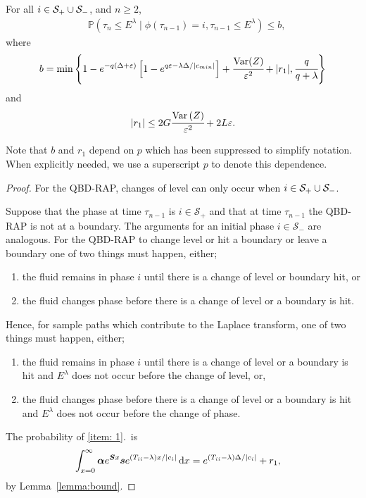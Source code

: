 \begin{lem}\label{lem: another bound}
	For all \(i\in\mathcal S_+\cup \mathcal{S}_-\), and \(n\geq 2\),
	\begin{align}
		&\mathbb P(\tau_n\leq E^\lambda \mid \phi(\tau_{n-1})=i, \tau_{n-1}\leq  E^\lambda ) \leq b,
	\end{align}
	where 
	\[b = \min\left\{1-e^{-q(\Delta+\varepsilon)}\left[1-e^{q\varepsilon-\lambda \Delta/|c_{min}|}\right] + \cfrac{\mathrm{Var}(Z)}{\varepsilon^2} + |r_1|,\cfrac{q}{q+\lambda}\right\}\]
	and  
	\[|r_1|\leq 2G\cfrac{\mathrm{Var} \left(Z\right)}{\varepsilon^2} + 2L\varepsilon.\]
\end{lem}
Note that \(b\) and \(r_1\) depend on \(p\) which has been suppressed to simplify notation. When explicitly needed, we use a superscript \(p\) to denote this dependence.  
\begin{proof}
	For the QBD-RAP, changes of level can only occur when \(i\in\mathcal S_+\cup\mathcal{S}_-\). 
	
	Suppose that the phase at time \(\tau_{n-1}\) is \(i\in\mathcal S_+\) and that at time \(\tau_{n-1}\) the QBD-RAP is not at a boundary. The arguments for an initial phase \(i\in\mathcal S_-\) are analogous. For the QBD-RAP to change level or hit a boundary or leave a boundary one of two things must happen, either; 
	\begin{enumerate}
		\item the fluid remains in phase \(i\) until there is a change of level or boundary hit, or
		\item the fluid changes phase before there is a change of level or a boundary is hit. 
	\end{enumerate}
	
	Hence, for sample paths which contribute to the Laplace transform, one of two things must happen, either; 
	\begin{enumerate}
		\item the fluid remains in phase \(i\) until there is a change of level or a boundary is hit and \(E^\lambda\) does not occur before the change of level, or, \label{item: 1}
		\item the fluid changes phase before there is a change of level or a boundary is hit and \(E^\lambda\) does not occur before the change of phase. \label{item: 2}
	\end{enumerate}
	
	The probability of \ref{item: 1}.~is 
	\begin{align}
		\int_{x=0}^\infty \boldsymbol \alpha e^{\boldsymbol{S}x}\boldsymbol s e^{(T_{ii}-\lambda)x/|c_i|}\, \mathrm{d} x 
		&= e^{(T_{ii}-\lambda)\Delta/|c_i|} + r_1,\label{eqn: bnd this 12345}
	\end{align}
	by Lemma~\ref{lemma:bound}.
	

\end{proof}
